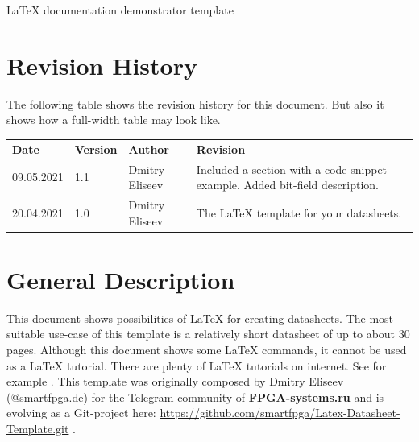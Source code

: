 \documentclass[a4paper, 10pt, onecolumn]{article}
\newcommand {\documentname}{LaTeX documentation demonstrator template}
\def\widehline{%
\noalign{\global\dimen1 \arrayrulewidth
\global\arrayrulewidth3\arrayrulewidth}%
\hline
\noalign{\global\arrayrulewidth\dimen1 }}
\newcommand{\chline}{%
    \arrayrulecolor{burgund}\widehline\arrayrulecolor{gray25}
}
\begin{document}
\thispagestyle{title}

\begin{flushleft}
\huge \documentname
\normalsize
\end{flushleft}

\section*{Revision History}
The following table shows the revision history for this document. But also it shows how a full-width table may look like.

\begin{table}[H]
\label{tab:revhist}
\centering\bgroup
\def\arraystretch{1.5}
\begin{tabularx}{\textwidth}{|l|l|l|X|}
    \hline
    \textbf{Date} & \textbf{Version} & \textbf{Author} & \textbf{Revision} \\ \chline
    09.05.2021 & 1.1 & Dmitry Eliseev & Included a section with a code snippet example. Added bit-field description.\\ \hline
    20.04.2021 & 1.0 & Dmitry Eliseev & The LaTeX template for your datasheets.\\ \hline
\end{tabularx}
\egroup
\end{table}


\section*{General Description}
This document shows possibilities of LaTeX for creating datasheets. 
The most suitable use-case of this template is a relatively short datasheet of up to about 30 pages.
Although this document shows some LaTeX commands, it cannot be used as a LaTeX tutorial.
There are plenty of LaTeX tutorials on internet.
See for example \cite{LatexTutorial}.
This template was originally composed by Dmitry Eliseev (@smartfpga.de) for the Telegram community of \textbf{FPGA-systems.ru} and is evolving as a Git-project here: \url{https://github.com/smartfpga/Latex-Datasheet-Template.git} \cite{GithubLink}.
\end{document}

